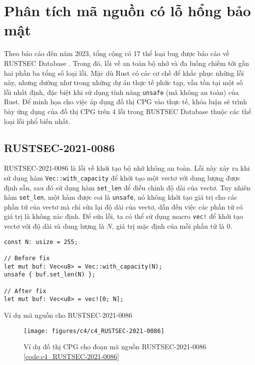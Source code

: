 \section{Phân tích mã nguồn có lỗ hổng bảo mật}

Theo báo cáo đến năm 2023, tổng cộng có 17 thể loại bug được báo cáo về RUSTSEC Database \cite{zheng2023closer}.
Trong đó, lỗi về an toàn bộ nhớ và đa luồng chiếm tới gần hai phần ba tổng số loại lỗi.
Mặc dù Rust có các cơ chế để khắc phục những lỗi này, nhưng dường như trong những dự án thực tế phức tạp, vẫn tồn tại một số lỗi nhất định, đặc biệt khi sử dụng tính năng \texttt{unsafe} (mã không an toàn) của Rust.
Để minh họa cho việc áp dụng đồ thị CPG vào thực tế, khóa luận sẽ trình bày ứng dụng của đồ thị CPG trên 4 lỗi trong RUSTSEC Database thuộc các thể loại lỗi phổ biến nhất.

\subsection{RUSTSEC-2021-0086}

RUSTSEC-2021-0086 là lỗi về khởi tạo bộ nhớ không an toàn.
Lỗi này xảy ra khi sử dụng hàm \texttt{Vec::with\_capacity} để khởi tạo một vectơ với dung lượng được định sẵn, sau đó sử dụng hàm \texttt{set\_len} để điều chỉnh độ dài của vectơ.
Tuy nhiên hàm \texttt{set\_len}, một hàm được coi là \texttt{unsafe}, nó không khởi tạo giá trị cho các phần tử của vectơ mà chỉ sửa lại độ dài của vectơ, dẫn đến việc các phần tử có giá trị là không xác định.
Để sửa lỗi, ta có thể sử dụng macro \texttt{vec!} để khởi tạo vectơ với độ dài và dung lượng là $N$, giá trị mặc định của mỗi phần tử là $0$.

\begin{listing}[H]
\begin{verbatim}
const N: usize = 255;

// Before fix
let mut buf: Vec<u8> = Vec::with_capacity(N);
unsafe { buf.set_len(N) };

// After fix
let mut buf: Vec<u8> = vec![0; N];
\end{verbatim}
\caption{Ví dụ mã nguồn cho RUSTSEC-2021-0086}
\label{code:c4_RUSTSEC-2021-0086}
\end{listing}

\begin{figure}[H]
    \texttt{[image: figures/c4/c4\_RUSTSEC-2021-0086]}
    \centering
    \caption{Ví dụ đồ thị CPG cho đoạn mã nguồn RUSTSEC-2021-0086 \ref{code:c4_RUSTSEC-2021-0086}}
    \label{img:c4_RUSTSEC-2021-0086}
\end{figure}

